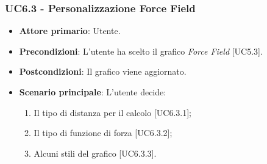 \subsubsection{UC6.3 - Personalizzazione Force Field}
\begin{itemize}
	\item \textbf{Attore primario}: Utente.
	
	\item \textbf{Precondizioni}: L'utente ha scelto il grafico \textit{Force Field} [UC5.3].
	
	\item \textbf{Postcondizioni}: Il grafico viene aggiornato.
	
	\item \textbf{Scenario principale}: L'utente decide:
	
\begin{enumerate}
\item Il tipo di distanza per il calcolo [UC6.3.1];
\item Il tipo di funzione di forza [UC6.3.2];
\item Alcuni stili del grafico [UC6.3.3].
\end{enumerate}	
		
\end{itemize}

